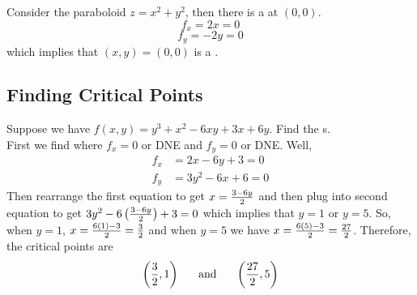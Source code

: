 \documentclass[english, 11pt]{article}
\begin{document}
\begin{exmp}
  Consider the paraboloid $z = x^2 + y^2$, then there is a  at $(0,0)$.
\[ f_x = 2x = 0 \]
\[ f_y = -2y = 0 \]
which implies that $(x,y) = (0,0)$ is a .
\end{exmp}

\subsection{Finding Critical Points}

\begin{exmp}
  Suppose we have $f(x,y) = y^3 + x^2 - 6xy + 3x + 6y$. Find the s. \\

  First we find where $f_x=0$ or DNE and $f_y = 0$ or DNE. Well,
  \begin{align*}
    f_x & = 2x - 6y + 3 = 0 \\
    f_y & = 3y^2 - 6x + 6 = 0
  \end{align*}
  Then rearrange the first equation to get $x = \frac{3-6y}{2}$ and then plug into second equation to get $3y^2 - 6 \left( \frac{3-6y}{2} \right) + 3 = 0$ which implies that $y = 1$ or $y = 5$. So, when $y = 1$, $x = \frac{6(1) - 3}{2} = \frac{3}{2}$ and when $y = 5$ we have $x = \frac{6(5) - 3}{2} = \frac{27}{2}$. Therefore, the critical points are
  \[ \left( \f{3}{2}, 1 \right) \ \ \ \ \mbox{ and } \ \ \ \ \left( \f{27}{2}, 5 \right)\]
\end{exmp}
\end{document}
